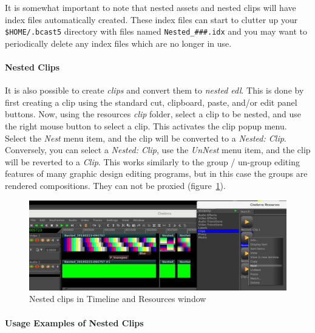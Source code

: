 It is somewhat important to note that nested assets and nested clips will have index files automatically created.  These index files can start to clutter up your \texttt{\$HOME/.bcast5} directory with files named \texttt{Nested\_\#\#\#.idx} and you may want to periodically delete any index files which are no longer in use.

\paragraph{Nested Clips} It is also possible to create \textit{clips} and convert them to \textit{nested edl}.  This is done by first creating a clip using the standard cut, clipboard, paste, and/or edit panel buttons.  Now, using the resources \textit{clip} folder, select a clip to be nested, and use the right mouse button to select a clip.  This activates the clip popup menu.  Select the \textit{Nest} menu item, and the clip will be converted to a \textit{Nested: Clip}. Conversely, you can select a \textit{Nested: Clip}, use the \textit{UnNest} menu item, and the clip will be reverted to a \textit{Clip}.  This works similarly to the group / un-group editing features of many graphic design editing programs, but in this case the groups are rendered compositions.  They can not be proxied (figure~\ref{fig:nesting}).
\begin{figure}[htpb]
    \centering
    \includegraphics[width=0.9\linewidth]{images/nesting.png}
    \caption{Nested clips in Timeline and Resources window}
    \label{fig:nesting}
\end{figure}

\paragraph{Usage Examples of Nested Clips}

